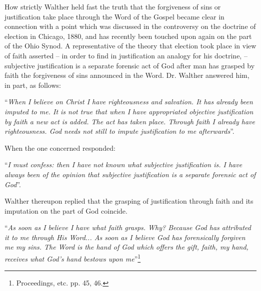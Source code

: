                 How strictly Walther held fast the truth that the forgiveness of sins or justification take place through the Word of the Gospel became clear in connection with a point which was discussed in the controversy on the doctrine of election in Chicago, 1880, and has recently been touched upon again on the part of the Ohio Synod.  A representative of the theory that election took place in view of faith asserted – in order to find in justification an analogy for his doctrine, – subjective justification is a separate forensic act of God after man has grasped by faith the forgiveness of sins announced in the Word.  Dr. Walther answered him, in part, as follows: \begin{displayquote}“\textit{When I believe on Christ I have righteousness and salvation.  It has already been imputed to me.  It is not true that when I have appropriated objective justification by faith a new act is added.  The act has taken place.  Through faith I already have righteousness.  God needs not still to impute justification to me afterwards}”.\end{displayquote}  When the one concerned responded: \begin{displayquote}“\textit{I must confess: then I have not known what subjective justification is.  I have always been of the opinion that subjective justification is a separate forensic act of God}”.\end{displayquote}  Walther thereupon replied that the grasping of justification through faith and its imputation on the part of God coincide. \begin{displayquote}``\textit{As soon as I believe I have what faith grasps.  Why?  Because God has attributed it to me through His Word... As soon as I believe God has forensically forgiven me my sins.  The Word is the hand of God which offers the gift, faith, my hand, receives what God’s hand bestows upon me}”\footnote{Proceedings, etc. pp. 45, 46.}\end{displayquote}

